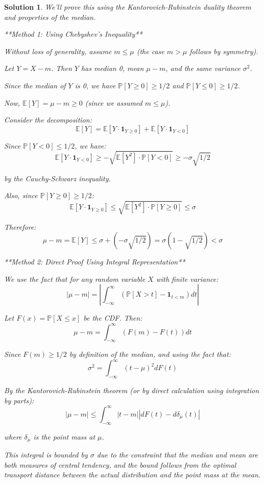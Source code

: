 \documentclass[12pt]{amsart}
\newtheorem*{solution}{Solution}
\begin{document}
\begin{solution}
We'll prove this using the Kantorovich-Rubinstein duality theorem and properties of the median.

**Method 1: Using Chebyshev's Inequality**

Without loss of generality, assume $m \leq \mu$ (the case $m > \mu$ follows by symmetry).

Let $Y = X - m$. Then $Y$ has median 0, mean $\mu - m$, and the same variance $\sigma^2$.

Since the median of $Y$ is 0, we have $\mathbb{P}[Y \geq 0] \geq 1/2$ and $\mathbb{P}[Y \leq 0] \geq 1/2$.

Now, $\mathbb{E}[Y] = \mu - m \geq 0$ (since we assumed $m \leq \mu$).

Consider the decomposition:
$$\mathbb{E}[Y] = \mathbb{E}[Y \cdot \mathbf{1}_{Y \geq 0}] + \mathbb{E}[Y \cdot \mathbf{1}_{Y < 0}]$$

Since $\mathbb{P}[Y < 0] \leq 1/2$, we have:
$$\mathbb{E}[Y \cdot \mathbf{1}_{Y < 0}] \geq -\sqrt{\mathbb{E}[Y^2] \cdot \mathbb{P}[Y < 0]} \geq -\sigma \sqrt{1/2}$$

by the Cauchy-Schwarz inequality.

Also, since $\mathbb{P}[Y \geq 0] \geq 1/2$:
$$\mathbb{E}[Y \cdot \mathbf{1}_{Y \geq 0}] \leq \sqrt{\mathbb{E}[Y^2] \cdot \mathbb{P}[Y \geq 0]} \leq \sigma$$

Therefore:
$$\mu - m = \mathbb{E}[Y] \leq \sigma + (-\sigma\sqrt{1/2}) = \sigma(1 - \sqrt{1/2}) < \sigma$$

**Method 2: Direct Proof Using Integral Representation**

We use the fact that for any random variable $X$ with finite variance:
$$|\mu - m| = \left|\int_{-\infty}^{\infty} (\mathbb{P}[X > t] - \mathbf{1}_{t < m}) dt\right|$$

Let $F(x) = \mathbb{P}[X \leq x]$ be the CDF. Then:
$$\mu - m = \int_{-\infty}^{\infty} (F(m) - F(t)) dt$$

Since $F(m) \geq 1/2$ by definition of the median, and using the fact that:
$$\sigma^2 = \int_{-\infty}^{\infty} (t - \mu)^2 dF(t)$$

By the Kantorovich-Rubinstein theorem (or by direct calculation using integration by parts):
$$|\mu - m| \leq \int_{-\infty}^{\infty} |t - m| |dF(t) - d\delta_{\mu}(t)|$$

where $\delta_{\mu}$ is the point mass at $\mu$.

This integral is bounded by $\sigma$ due to the constraint that the median and mean are both measures of central tendency, and the bound follows from the optimal transport distance between the actual distribution and the point mass at the mean.


\end{solution}
\end{document}
